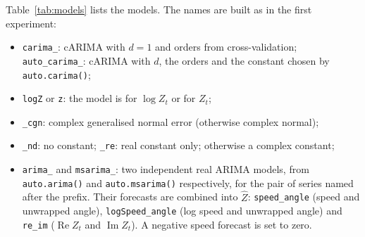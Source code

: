 \documentclass[11pt,a4paper]{article}
\newcommand{\code}[1]{\texttt{#1}}
\newcommand{\1}{\mathbf{1}}
\renewcommand{\Re}{\operatorname{Re}}
\renewcommand{\Im}{\operatorname{Im}}
\begin{document}
Table~\ref{tab:models} lists the models. The names are built as in the first experiment:
\begin{itemize}
  \item \code{carima\_}: cARIMA with $d = 1$ and orders from cross-validation;
    \code{auto\_carima\_}: cARIMA with $d$, the orders and the constant chosen by
    \code{auto.carima()};
  \item \code{logZ} or \code{z}: the model is for $\log Z_t$ or for $Z_t$;
  \item \code{\_cgn}: complex generalised normal error (otherwise complex normal);
  \item \code{\_nd}: no constant; \code{\_re}: real constant only; otherwise a complex constant;
  \item \code{arima\_} and \code{msarima\_}: two independent real ARIMA models, from
    \code{auto.arima()} and \code{auto.msarima()} respectively, for the pair of series named after
    the prefix. Their forecasts are combined into $\hat Z$:
    \code{speed\_angle} (speed and unwrapped angle),
    \code{logSpeed\_angle} (log speed and unwrapped angle) and
    \code{re\_im} ($\Re Z_t$ and $\Im Z_t$).
    A negative speed forecast is set to zero.
\end{itemize}
\end{document}
